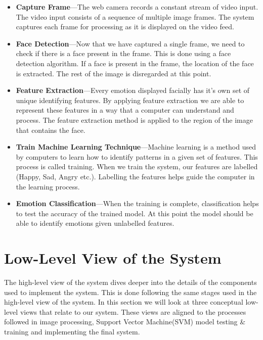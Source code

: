 \begin{itemize}
  \item \textbf{Capture Frame}---The web camera records a constant stream of video input. The video input consists of a sequence of multiple image frames. The system captures each frame for processing as it is displayed on the video feed.

  \item \textbf{Face Detection}---Now that we have captured a single frame, we need to check if there is a face present in the frame. This is done using a face detection algorithm. If a face is present in the frame, the location of the face is extracted. The rest of the image is disregarded at this point.

  \item \textbf{Feature Extraction}---Every emotion displayed facially has it's own set of unique identifying features. By applying feature extraction we are able to represent these features in a way that a computer can understand and process. The feature extraction method is applied to the region of the image that contains the face.

  \item \textbf{Train Machine Learning Technique}---Machine learning is a method used by computers to learn how to identify patterns in a given set of features. This process is called training. When we train the system, our features are labelled (Happy, Sad, Angry etc.). Labelling the features helps guide the computer in the learning process.

  \item \textbf{Emotion Classification}---When the training is complete, classification helps to test the accuracy of the trained model. At this point the model should be able to identify emotions given unlabelled features.
\end{itemize}

\section{Low-Level View of the System}\label{sec:lowlevel}
The high-level view of the system dives deeper into the details of the components used to implement the system. This is done following the same stages used in the high-level view of the system. In this section we will look at three conceptual low-level views that relate to our system. These views are aligned to the processes followed in image processing, Support Vector Machine(SVM) model testing \& training and implementing the final system.
